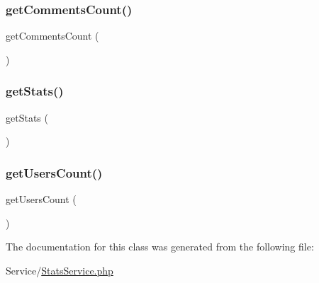 \subsubsection{\texorpdfstring{getCommentsCount()}{getCommentsCount()}}
{\footnotesize\ttfamily get\+Comments\+Count (\begin{DoxyParamCaption}{ }\end{DoxyParamCaption})}

\mbox{\label{class_app_1_1_service_1_1_stats_service_acf0272219b2977c1dc461ed86e995947}} 
\subsubsection{\texorpdfstring{getStats()}{getStats()}}
{\footnotesize\ttfamily get\+Stats (\begin{DoxyParamCaption}{ }\end{DoxyParamCaption})}

\mbox{\label{class_app_1_1_service_1_1_stats_service_a8a2c9fe04bd7747f2b15a671fc039320}} 
\subsubsection{\texorpdfstring{getUsersCount()}{getUsersCount()}}
{\footnotesize\ttfamily get\+Users\+Count (\begin{DoxyParamCaption}{ }\end{DoxyParamCaption})}



The documentation for this class was generated from the following file\+:\begin{DoxyCompactItemize}
\item 
Service/\mbox{\hyperlink{_stats_service_8php}{Stats\+Service.\+php}}\end{DoxyCompactItemize}
